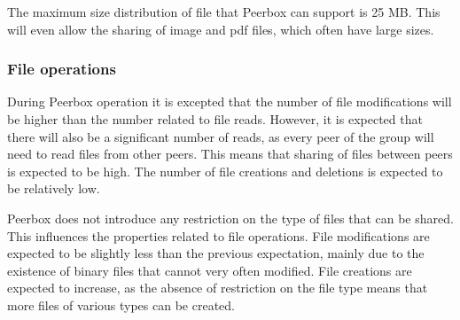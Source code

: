 The maximum size distribution of file that Peerbox can support is 25 MB. This will even allow the sharing of image and pdf files, which often have large sizes.


\subsubsection{File operations}

During Peerbox operation it is excepted that the number of file modifications will be higher than the number related  to file reads. However, it is expected that there will also be a significant number of reads, as every peer of the group will need to read files from other peers. This means that sharing of files between peers is expected to be high. The number of file creations and deletions is expected to be relatively low.\\


Peerbox does not introduce any restriction on the type of files that can be shared. This influences the properties related to file operations. File modifications are expected to be slightly less than the previous expectation, mainly due to the existence of binary files that cannot very often modified. File creations are expected to increase, as the absence of restriction on the file type means that more files of various types can be created.